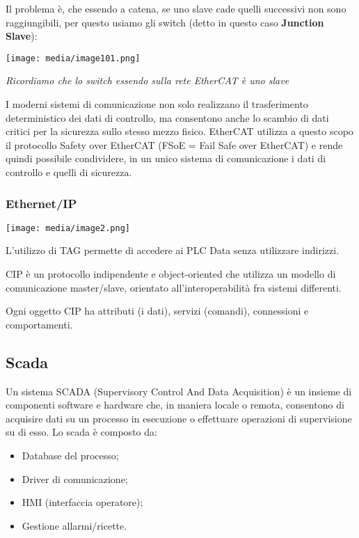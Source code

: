 Il problema è, che essendo a catena, se uno slave cade quelli successivi
non sono raggiungibili, per questo usiamo gli switch (detto in questo
caso \textbf{Junction Slave}):

\texttt{[image: media/image101.png]}

\emph{Ricordiamo che lo switch essendo sulla rete EtherCAT è uno slave}

I moderni sistemi di comunicazione non solo realizzano il trasferimento
deterministico dei dati di controllo, ma consentono anche lo scambio di
dati critici per la sicurezza sullo stesso mezzo fisico. EtherCAT
utilizza a questo scopo il protocollo Safety over EtherCAT (FSoE = Fail
Safe over EtherCAT) e rende quindi possibile condividere, in un unico
sistema di comunicazione i dati di controllo e quelli di sicurezza.

\subsubsection{Ethernet/IP}\label{ethernetip}

\texttt{[image: media/image2.png]}

L'utilizzo di TAG permette di accedere ai PLC Data senza utilizzare
indirizzi.

CIP è un protocollo indipendente e object-oriented che utilizza un
modello di comunicazione master/slave, orientato all'interoperabilità
fra sistemi differenti.

Ogni oggetto CIP ha attributi (i dati), servizi (comandi), connessioni e
comportamenti.

\subsection{Scada}\label{scada}

Un sistema SCADA (Supervisory Control And Data Acquisition) è un insieme
di componenti software e hardware che, in maniera locale o remota,
consentono di acquisire dati su un processo in esecuzione o effettuare
operazioni di supervisione su di esso. Lo scada è composto da:

\begin{itemize}
\item
  Database del processo;
\item
  Driver di comunicazione;
\item
  HMI (interfaccia operatore);
\item
  Gestione allarmi/ricette.
\end{itemize}

